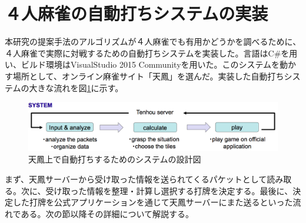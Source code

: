 



\section{４人麻雀の自動打ちシステムの実装} %
本研究の提案手法のアルゴリズムが４人麻雀でも有用かどうかを調べるために、４人麻雀で実際に対戦するための自動打ちシステムを実装した。言語はC\#を用い、ビルド環境はVisualStudio 2015 Communityを用いた。このシステムを動かす場所として、オンライン麻雀サイト「天鳳」を選んだ。実装した自動打ちシステムの大きな流れを図\ref{imp1}に示す。


\begin{figure}[h]
 \centering
 \includegraphics[keepaspectratio, scale=0.4
 ,bb=0 0 1226 243]
      {img/imp1.png}
 \caption{天鳳上で自動打ちするためのシステムの設計図}
 \label{imp1}
\end{figure}

まず、天鳳サーバーから受け取った情報を送られてくるパケットとして読み取る。次に、受け取った情報を整理・計算し選択する打牌を決定する。最後に、決定した打牌を公式アプリケーションを通じて天鳳サーバーにまた送るといった流れである。次の節以降その詳細について解説する。

